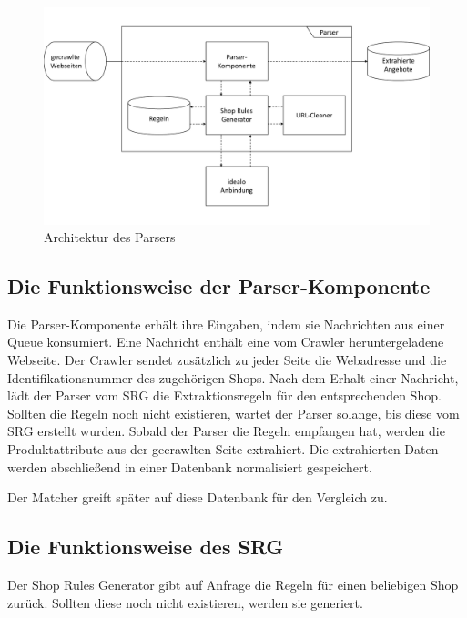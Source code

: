 \begin{figure}[H]
    \centering
    \includegraphics[width=\textwidth, trim=0 1.7cm 0 1.7cm, clip]{resources/Architektur-Parser.pdf}
    \caption{Architektur des Parsers}
    \label{abb:architektur-parser}
\end{figure}

\subsection{Die Funktionsweise der Parser-Komponente}
\label{subsec:funktionsweise-parser}

Die Parser-Komponente erhält ihre Eingaben, indem sie Nachrichten aus einer Queue konsumiert.
Eine Nachricht enthält eine vom Crawler heruntergeladene Webseite.
Der Crawler sendet zusätzlich zu jeder Seite die Webadresse und die Identifikationsnummer des zugehörigen Shops.
Nach dem Erhalt einer Nachricht, lädt der Parser vom SRG die Extraktionsregeln für den entsprechenden Shop.
Sollten die Regeln noch nicht existieren, wartet der Parser solange, bis diese vom SRG erstellt wurden.
Sobald der Parser die Regeln empfangen hat, werden die Produktattribute aus der gecrawlten Seite extrahiert.
Die extrahierten Daten werden abschließend in einer Datenbank normalisiert gespeichert.

Der Matcher greift später auf diese Datenbank für den Vergleich zu.

\subsection{Die Funktionsweise des SRG}
\label{subsec:funktionsweise-srg}

Der Shop Rules Generator gibt auf Anfrage die Regeln für einen beliebigen Shop zurück.
Sollten diese noch nicht existieren, werden sie generiert.

